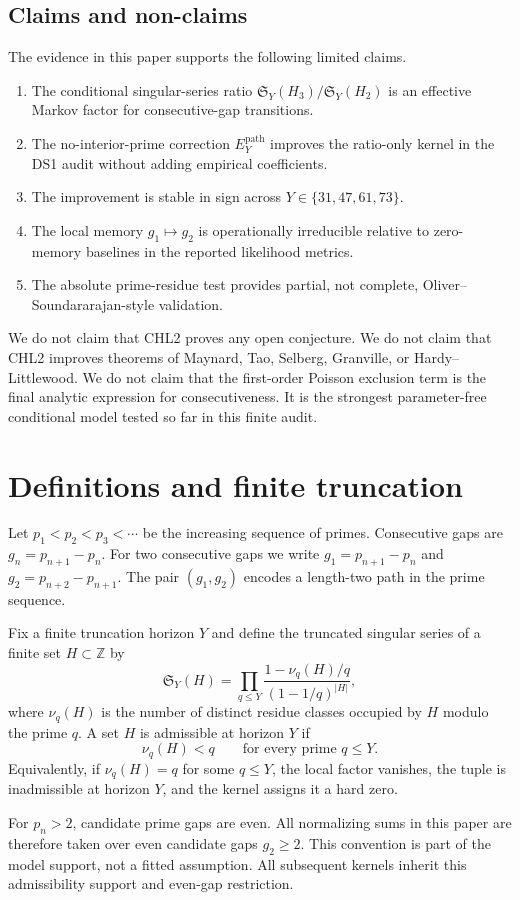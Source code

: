 \documentclass[10pt]{article}
\newcommand{\SY}{\mathfrak{S}_Y}
\newcommand{\Epath}{E_Y^{\mathrm{path}}}
\begin{document}
\subsection{Claims and non-claims}
The evidence in this paper supports the following limited claims.
\begin{enumerate}
\item The conditional singular-series ratio $\SY(H_3)/\SY(H_2)$ is an effective Markov factor for consecutive-gap transitions.
\item The no-interior-prime correction $\Epath$ improves the ratio-only kernel in the DS1 audit without adding empirical coefficients.
\item The improvement is stable in sign across $Y\in\{31,47,61,73\}$.
\item The local memory $g_1\mapsto g_2$ is operationally irreducible relative to zero-memory baselines in the reported likelihood metrics.
\item The absolute prime-residue test provides partial, not complete, Oliver--Soundararajan-style validation.
\end{enumerate}
We do not claim that CHL2 proves any open conjecture. We do not claim that CHL2 improves theorems of Maynard, Tao, Selberg, Granville, or Hardy--Littlewood. We do not claim that the first-order Poisson exclusion term is the final analytic expression for consecutiveness. It is the strongest parameter-free conditional model tested so far in this finite audit.
\section{Definitions and finite truncation}
Let $p_1<p_2<p_3<\cdots$ be the increasing sequence of primes. Consecutive gaps are $g_n=p_{n+1}-p_n$. For two consecutive gaps we write $g_1=p_{n+1}-p_n$ and $g_2=p_{n+2}-p_{n+1}$. The pair $(g_1,g_2)$ encodes a length-two path in the prime sequence.

Fix a finite truncation horizon $Y$ and define the truncated singular series of a finite set $H\subset\mathbb Z$ by
\[
\SY(H)=\prod_{q\le Y}\frac{1-\nu_q(H)/q}{(1-1/q)^{|H|}},
\]
where $\nu_q(H)$ is the number of distinct residue classes occupied by $H$ modulo the prime $q$. A set $H$ is admissible at horizon $Y$ if
\[
\nu_q(H)<q\qquad\text{for every prime }q\le Y.
\]
Equivalently, if $\nu_q(H)=q$ for some $q\le Y$, the local factor vanishes, the tuple is inadmissible at horizon $Y$, and the kernel assigns it a hard zero.

For $p_n>2$, candidate prime gaps are even. All normalizing sums in this paper are therefore taken over even candidate gaps $g_2\ge2$. This convention is part of the model support, not a fitted assumption. All subsequent kernels inherit this admissibility support and even-gap restriction.
\end{document}
